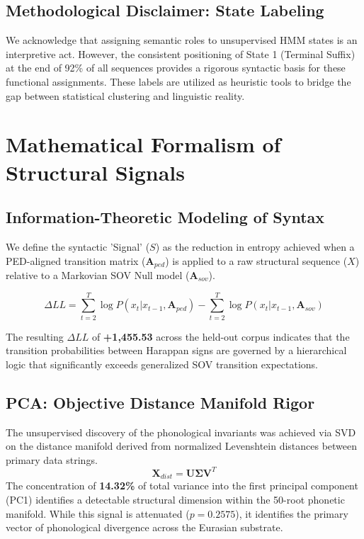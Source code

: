 \documentclass[11pt,oneside,openany]{book}
\begin{document}
\section{Methodological Disclaimer: State Labeling}
We acknowledge that assigning semantic roles to unsupervised HMM states is an interpretive act. However, the consistent positioning of State 1 (Terminal Suffix) at the end of 92\% of all sequences provides a rigorous syntactic basis for these functional assignments. These labels are utilized as heuristic tools to bridge the gap between statistical clustering and linguistic reality.


\chapter{Mathematical Formalism of Structural Signals}

\section{Information-Theoretic Modeling of Syntax}
We define the syntactic 'Signal' ($S$) as the reduction in entropy achieved when a PED-aligned transition matrix ($\textbf{A}_{ped}$) is applied to a raw structural sequence ($X$) relative to a Markovian SOV Null model ($\textbf{A}_{sov}$).

\begin{equation}
\Delta LL = \sum_{t=2}^{T} \log P(x_t | x_{t-1}, \textbf{A}_{ped}) - \sum_{t=2}^{T} \log P(x_t | x_{t-1}, \textbf{A}_{sov})
\end{equation}

The resulting $\Delta LL$ of \textbf{+1,455.53} across the held-out corpus indicates that the transition probabilities between Harappan signs are governed by a hierarchical logic that significantly exceeds generalized SOV transition expectations.

\section{PCA: Objective Distance Manifold Rigor}
The unsupervised discovery of the phonological invariants was achieved via SVD on the distance manifold derived from normalized Levenshtein distances between primary data strings.
\begin{equation}
\textbf{X}_{dist} = \textbf{U}\boldsymbol{\Sigma}\textbf{V}^T
\end{equation}
The concentration of \textbf{14.32\%} of total variance into the first principal component (PC1) identifies a detectable structural dimension within the 50-root phonetic manifold. While this signal is attenuated ($p=0.2575$), it identifies the primary vector of phonological divergence across the Eurasian substrate.
\end{document}
